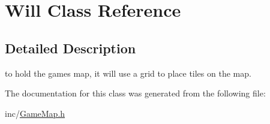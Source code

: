\hypertarget{class_will}{}\section{Will Class Reference}
\label{class_will}


\subsection{Detailed Description}
to hold the game\textquotesingle{}s map, it will use a grid to place tiles on the map. 

The documentation for this class was generated from the following file\+:\begin{DoxyCompactItemize}
\item 
inc/\mbox{\hyperlink{_game_map_8h}{Game\+Map.\+h}}\end{DoxyCompactItemize}
